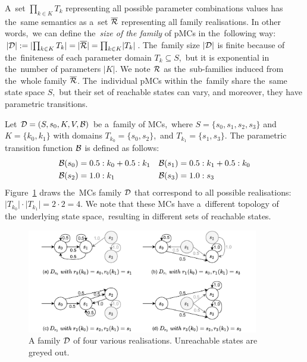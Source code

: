 A~set $\prod_{k \in K} T_k$ representing all possible parameter combinations values has the~same semantics as a~set $\overline{\mathcal{R}}$ representing all family realisations.
In other words,~we can define the~\textit{size of the family} of pMCs in the~following way: $\lvert \mathcal{D} \rvert := \lvert \prod_{k \in K} T_k \rvert = \lvert \overline{\mathcal{R}} \rvert = \prod_{k \in K} \lvert T_k \rvert$.
The~family size $\lvert \mathcal{D} \rvert$ is finite because of the~finiteness of each parameter domain $T_k \subseteq S$,~but it is exponential in the~number of parameters $\lvert K \rvert$.
We note $\mathcal{R}$ as the~sub-families induced from the~whole family $\overline{\mathcal{R}}$.
The~individual pMCs within the~family share the~same state space $S$,~but their set of reachable states can vary, and moreover, they have parametric transitions.

\begin{example}\label{exam:mcfamily}
Let $\mathcal{D} = (S,s_{0},K, V, \mathcal{B})$ be a~family of MCs,~where $S = \{s_0, s_1, s_2, s_3\}$ and $K = \{ k_0, k_1\}$ with domains $T_{k_0} = \{s_0, s_2\}$,~and $T_{k_1} = \{s_1, s_3\}$.
The parametric transition function $\mathcal{B}$ is defined as follows:
\begin{align*}
    \mathcal{B}(s_0) &= 0.5 : k_0 + 0.5 : k_1  &  \mathcal{B}(s_1)  &= 0.5 : k_1  + 0.5 : k_0 \\
    \mathcal{B}(s_2) &= 1.0: k_1   &  \mathcal{B}(s_3)  &= 1.0 : s_3
\end{align*}
Figure~\ref{fig:mcfamily} draws the~MCs family $\mathcal{D}$ that correspond to all possible realisations: $\lvert T_{k_0} \rvert \cdot \lvert T_{k_1} \rvert = 2 \cdot 2 = 4$.
We note that these MCs have a~different topology of the~underlying state space,~resulting in different sets of reachable states.
\end{example}

\begin{figure}[ht!]
\centering
\includegraphics[width=0.9\textwidth]{figures/MCFamily.pdf}
\caption{A family $\mathcal{D}$ of four various realisations. Unreachable states are greyed out.}%
\label{fig:mcfamily}%
\end{figure}

